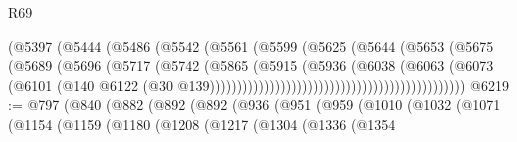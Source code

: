 \begin{lexlean}{R69}
\begin{coremodule}
{                                                    (@5397
                                                      (@5444
                                                        (@5486
                                                          (@5542
                                                            (@5561
                                                              (@5599
                                                                (@5625
                                                                  (@5644
                                                                    (@5653
                                                                      (@5675
                                                                        (@5689
                                                                          (@5696
                                                                            (@5717
                                                                              (@5742
                                                                                (@5865
                                                                                  (@5915
                                                                                    (@5936
                                                                                      (@6038
                                                                                        (@6063
                                                                                          (@6073
                                                                                            (@6101
                                                                                              (@140
                                                                                                @6122
                                                                                                (@30
                                                                                                  @139)))))))))))))))))))))))))))))))))))))))))))))))
@6219 := @797
    (@840
      (@882
        (@892
          (@892
            (@936
              (@951
                (@959
                  (@1010
                    (@1032
                      (@1071
                        (@1154
                          (@1159
                            (@1180
                              (@1208
                                (@1217
                                  (@1304
                                    (@1336
                                      (@1354
}
\end{coremodule}
\end{lexlean}
